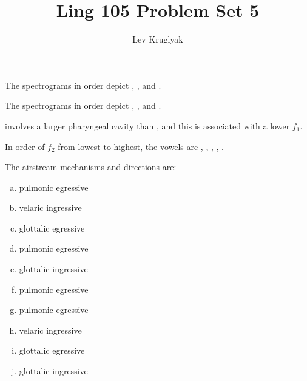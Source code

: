 \documentclass{../../templates/lkx_pset}
\title{Ling 105 Problem Set 5}
\author{Lev Kruglyak}
\begin{document}
\maketitle

\begin{problem}{1}
\end{problem}
\begin{solution}
	The spectrograms in order depict \textipa{[i]}, \textipa{[u]}, and \textipa{[A]}.
\end{solution}

\begin{problem}{2}
\end{problem}
\begin{solution}
	The spectrograms in order depict \textipa{[k\ae]}, \textipa{[t\ae]}, and \textipa{[p\ae]}.
\end{solution}

\begin{problem}{3}
\end{problem}
\begin{solution}
	\textipa{[i]} involves a larger pharyngeal cavity than \textipa{[A]}, and this is associated with a lower $f_1$.
\end{solution}

\begin{problem}{4}
\end{problem}
\begin{solution}
	In order of $f_2$ from lowest to highest, the vowels are \textipa{[u]}, \textipa{[A]}, \textipa{[\ae]}, \textipa{[E]}, \textipa{[i]}.
\end{solution}

\begin{problem}{5}
\end{problem}
\begin{solution}
	The airstream mechanisms and directions are:
	\begin{enumerate}[(a)]
		\item pulmonic egressive
		\item velaric ingressive
		\item glottalic egressive
		\item pulmonic egressive 
		\item glottalic ingressive
		\item pulmonic egressive
		\item pulmonic egressive
		\item velaric ingressive
		\item glottalic egressive
		\item glottalic ingressive
	\end{enumerate}
\end{solution}
\end{document}
